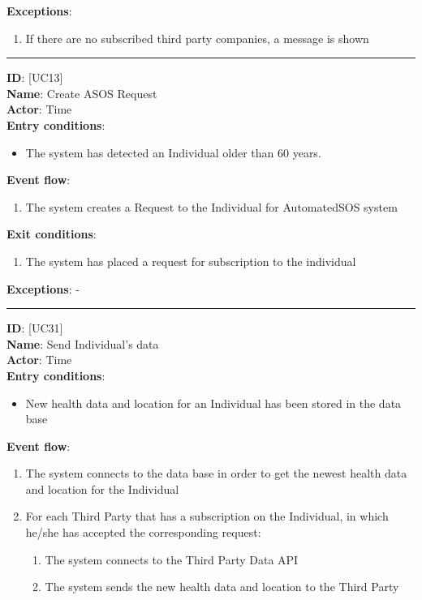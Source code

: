 \documentclass[a4paper, hidelinks, 12pt]{report}
\newcommand\usecase[1]{ [UC#1] }
\begin{document}
\begin{itemize}
		\textbf{Exceptions}:
  		\begin{enumerate}
			\item{If there are no subscribed third party companies, a message is shown}
		\end{enumerate}
		\rule{\linewidth}{0.4pt}
		\textbf{ID}: \usecase{13} \\
		\textbf{Name}: Create ASOS Request \\
		\textbf{Actor}: Time \\
		\textbf{Entry conditions}:
		\begin{itemize}
			\item{The system has detected an Individual older than 60 years.}
		\end{itemize}
		\textbf{Event flow}:
		\begin{enumerate}
			\item{The system creates a Request to the Individual for AutomatedSOS system}
		\end{enumerate}
		\textbf{Exit conditions}:
		\begin{enumerate}
			\item{The system has placed a request for subscription to the individual}
		\end{enumerate}
		\textbf{Exceptions}: - \\
		\rule{\linewidth}{0.4pt}
		\textbf{ID}: \usecase{31} \\
		\textbf{Name}: Send Individual's data \\
		\textbf{Actor}: Time \\
		\textbf{Entry conditions}:
		\begin{itemize}
			\item{New health data and location for an Individual has been stored in the data base}
		\end{itemize}
		\textbf{Event flow}:
		\begin{enumerate}
			\item{The system connects to the data base in order to get the newest health data and location for the Individual}
			\item{For each Third Party that has a subscription on the Individual, in which he/she has accepted the corresponding request:}
			\begin{enumerate}
				\item{The system connects to the Third Party Data API}
				\item{The system sends the new health data and location to the Third Party}
			\end{enumerate}

\end{enumerate}
\end{itemize}
\end{document}
